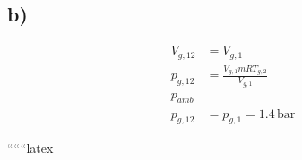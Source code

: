 

\subsection*{b)}

\begin{align*}
V_{g,12} &= V_{g,1} \\
p_{g,12} &= \frac{V_{g,1} mRT_{g,2}}{V_{g,1}} \\
p_{amb} \\
p_{g,12} &= p_{g,1} = 1.4 \, \text{bar}
\end{align*}

``````latex